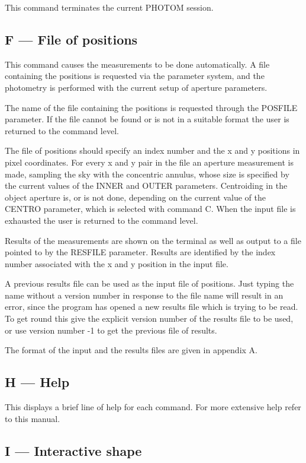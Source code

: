 This command terminates the current PHOTOM session.

\subsection{F --- File of positions}

This command causes the measurements to be done automatically. A file
containing the positions is requested via the parameter system, and the
photometry is performed with the current setup of aperture parameters.

The name of the file containing the positions is requested through the
POSFILE parameter. If the file cannot be found or is not in a suitable
format the user is returned to the command level. 

The file of positions should specify an index number and the x and y
positions in pixel coordinates. For every x and y pair in the file an
aperture measurement is made, sampling the sky with the concentric
annulus, whose size is specified by the current values of the INNER and
OUTER parameters. Centroiding in the object aperture is, or is not done,
depending on the current value of the CENTRO parameter, which is selected
with command C. When the input file is exhausted the user is returned
to the command level.

Results of the measurements are shown on the terminal as well as output
to a file pointed to by the RESFILE parameter. Results are identified by
the index number associated with the x and y position in the input file.

A previous results file can be used as the input file of positions. Just
typing the name without a version number in response to the file name will
result in an error, since the program has opened a new results file which
is trying to be read. To get round this give the explicit version number
of the results file to be used, or use version number -1 to get the
previous file of results.

The format of the input and the results files are given in appendix A.

\subsection{H --- Help}

This displays a brief line of help for each command. For more extensive
help refer to this manual.

\subsection{I --- Interactive shape}

